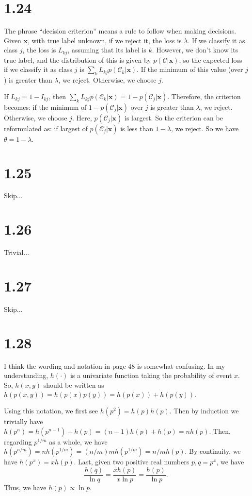\documentclass[12pt]{article}
\newcommand{\vect}[1]{\mathbf{#1}}
\begin{document}
\section{1.24}
The phrase ``decision criterion'' means a rule to follow when making decisions. Given $\vect{x}$, with true label unknown, if we reject it, the loss is $\lambda$. If we classify it as class $j$, the loss is $L_{kj}$, assuming that its label is $k$. However, we don't know its true label, and the distribution of this is given by $p(\mathcal{C}|\vect{x})$, so the expected loss if we classify it as class $j$ is $\sum_{k} L_{kj}p(\mathcal{C}_k|\vect{x})$. If the minimum of this value (over $j$) is greater than $\lambda$, we reject. Otherwise, we choose $j$.

If $L_{kj}=1-I_{kj}$, then $\sum_{k} L_{kj}p(\mathcal{C}_k|\vect{x}) = 1- p(\mathcal{C}_j|\vect{x})$. Therefore, the criterion becomes: if the minimum of $1- p(\mathcal{C}_j|\vect{x})$ over $j$ is greater than $\lambda$, we reject. Otherwise, we choose $j$. Here,  $p(\mathcal{C}_j|\vect{x})$ is largest. So the criterion can be reformulated as: if  largest of $p(\mathcal{C}_j|\vect{x})$ is less than $1-\lambda$, we reject. So we have $\theta = 1-\lambda$.

\section{1.25}
Skip...


\section{1.26}
Trivial...

\section{1.27}
Skip...

\section{1.28} %
I think the wording and notation in page 48 is somewhat confusing. In my understanding, $h(\cdot)$ is a univariate function taking the probability of event $x$. So, $h(x,y)$ should be written as $h(p(x,y)) = h(p(x)p(y)) = h(p(x))+h(p(y))$. 

Using this notation, we first see $h(p^2)=h(p) h(p)$. Then by induction we trivially have $h(p^n) = h(p^{n-1})+h(p) = (n-1) h(p)+h(p) = n h(p)$. Then, regarding $p^{1/m}$ as a whole, we have $h(p^{n/m}) = n h(p^{1/m}) = (n/m) m h(p^{1/m}) = n/m h(p)$. By continuity, we have $h(p^x) = x h(p) $. Last, given two positive real numbers $p, q=p^x$, we have
\begin{equation}
    \frac{h(q)}{\ln q} = \frac{x h(p)}{x \ln p} = \frac{h(p)}{\ln p}.
\end{equation}
Thus, we have $h(p) \propto \ln p$.
\end{document}
